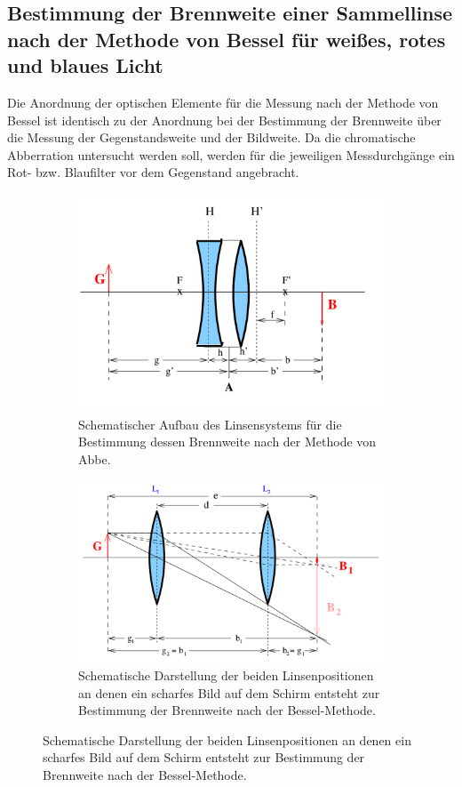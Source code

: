 \subsection{Bestimmung der Brennweite einer Sammellinse nach der Methode von Bessel für
weißes, rotes und blaues Licht}
\label{sec:bessel}
Die Anordnung der optischen Elemente für die Messung nach der Methode von Bessel ist identisch
zu der Anordnung bei der Bestimmung der Brennweite über die Messung der Gegenstandsweite und der
Bildweite.
Da die chromatische Abberration untersucht werden soll, werden für die jeweiligen
Messdurchgänge ein Rot- bzw. Blaufilter vor dem Gegenstand angebracht.
\begin{figure}
	\centering
	\begin{subfigure}[b]{0.48\textwidth}
  \centering
  \includegraphics[width=1.0\textwidth]{Bilder/Linselol.png}
  \caption{Schematischer Aufbau des Linsensystems für die Bestimmung dessen Brennweite nach der Methode von Abbe.}
  \label{fig:lensesystemlol}
\end{subfigure}
	\begin{subfigure}[b]{0.48\textwidth}
  \centering
  \includegraphics[width=1.0\textwidth]{Bilder/Bessel.png}
  \caption{Schematische Darstellung der beiden Linsenpositionen an denen ein scharfes Bild auf dem Schirm entsteht zur Bestimmung der Brennweite nach der Bessel-Methode.}
  \label{fig:besselmess}
\end{subfigure}
\end{figure}
